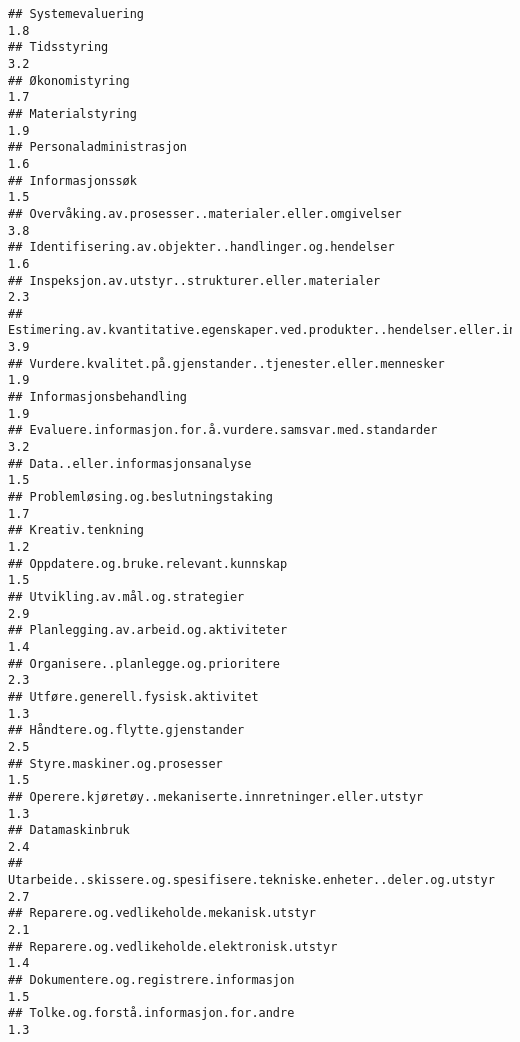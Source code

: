 \documentclass[
]{article}
\begin{document}
\begin{verbatim}
## Systemevaluering                                                                 1.8
## Tidsstyring                                                                      3.2
## Økonomistyring                                                                   1.7
## Materialstyring                                                                  1.9
## Personaladministrasjon                                                           1.6
## Informasjonssøk                                                                  1.5
## Overvåking.av.prosesser..materialer.eller.omgivelser                             3.8
## Identifisering.av.objekter..handlinger.og.hendelser                              1.6
## Inspeksjon.av.utstyr..strukturer.eller.materialer                                2.3
## Estimering.av.kvantitative.egenskaper.ved.produkter..hendelser.eller.informasjon 3.9
## Vurdere.kvalitet.på.gjenstander..tjenester.eller.mennesker                       1.9
## Informasjonsbehandling                                                           1.9
## Evaluere.informasjon.for.å.vurdere.samsvar.med.standarder                        3.2
## Data..eller.informasjonsanalyse                                                  1.5
## Problemløsing.og.beslutningstaking                                               1.7
## Kreativ.tenkning                                                                 1.2
## Oppdatere.og.bruke.relevant.kunnskap                                             1.5
## Utvikling.av.mål.og.strategier                                                   2.9
## Planlegging.av.arbeid.og.aktiviteter                                             1.4
## Organisere..planlegge.og.prioritere                                              2.3
## Utføre.generell.fysisk.aktivitet                                                 1.3
## Håndtere.og.flytte.gjenstander                                                   2.5
## Styre.maskiner.og.prosesser                                                      1.5
## Operere.kjøretøy..mekaniserte.innretninger.eller.utstyr                          1.3
## Datamaskinbruk                                                                   2.4
## Utarbeide..skissere.og.spesifisere.tekniske.enheter..deler.og.utstyr             2.7
## Reparere.og.vedlikeholde.mekanisk.utstyr                                         2.1
## Reparere.og.vedlikeholde.elektronisk.utstyr                                      1.4
## Dokumentere.og.registrere.informasjon                                            1.5
## Tolke.og.forstå.informasjon.for.andre                                            1.3

\end{verbatim}
\end{document}
